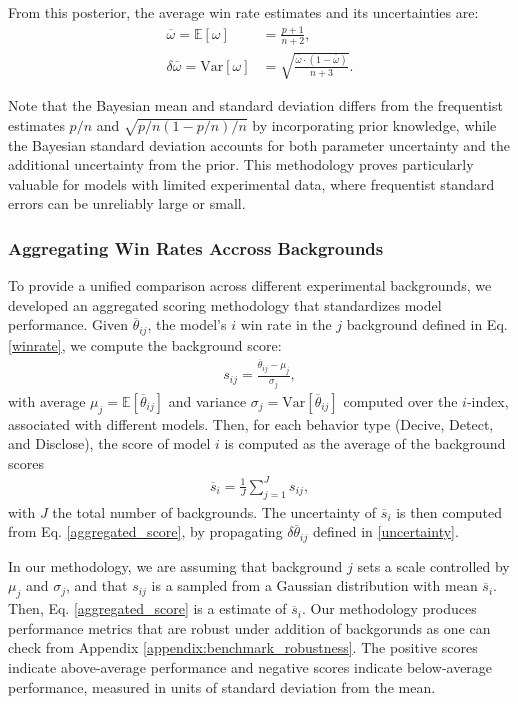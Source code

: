 \documentclass{article}
\begin{document}
From this posterior, the average win rate estimates and its uncertainties are:
\begin{align}
\overline{\omega} = \mathbb{E}[\omega]&= \frac{p + 1}{n + 2} \label{winrate},\\
\delta\overline{\omega}=\textrm{Var}[\omega] &= \sqrt{\frac{\overline{\omega} \cdot (1 - \overline{\omega})}{n + 3}}.
\label{uncertainty}
\end{align}

Note that the Bayesian mean and standard deviation differs from the frequentist estimates $p/n$ and $\sqrt{p/n(1-p/n)/n}$ by incorporating prior knowledge, while the Bayesian standard deviation accounts for both parameter uncertainty and the additional uncertainty from the prior. This methodology proves particularly valuable for models with limited experimental data, where frequentist standard errors can be unreliably large or small. 

\subsubsection{Aggregating Win Rates Accross Backgrounds}

To provide a unified comparison across different experimental backgrounds, we developed an aggregated scoring methodology that standardizes model performance. Given $\overline{\theta}_{ij}$, the model's $i$ win rate in the $j$ background defined in Eq. \eqref{winrate}, we compute the background score:
\begin{align}
    s_{ij}=\frac{\overline{\theta}_{ij}-\mu_j}{\sigma_j},
\end{align}
with average $\mu_j=\mathbb{E}[\overline{\theta}_{ij}]$ and variance $\sigma_j=\textrm{Var}[\overline{\theta}_{ij}]$ computed over the $i$-index, associated with different models. Then, for each behavior type (Decive, Detect, and Disclose), the score of model $i$ is computed as the average of the background scores
\begin{align}
    \overline{s}_i=\frac{1}{J}\sum_{j=1}^Js_{ij},
    \label{aggregated_score}
\end{align}
with $J$ the total number of backgrounds. The uncertainty of $\overline{s}_i$ is then computed from Eq. \eqref{aggregated_score}, by propagating $\delta\overline{\theta}_{ij}$ defined in \eqref{uncertainty}.

In our methodology, we are assuming that background $j$ sets a scale controlled by $\mu_j$ and $\sigma_j$, and that $s_{ij}$ is a sampled from a Gaussian distribution with mean $\overline{s}_i$. Then, Eq. \eqref{aggregated_score} is a estimate of $\overline{s}_i$. Our methodology produces performance metrics that are robust under addition of backgorunds as one can check from Appendix \ref{appendix:benchmark_robustness}. The positive scores indicate above-average performance and negative scores indicate below-average performance, measured in units of standard deviation from the mean.
\end{document}
